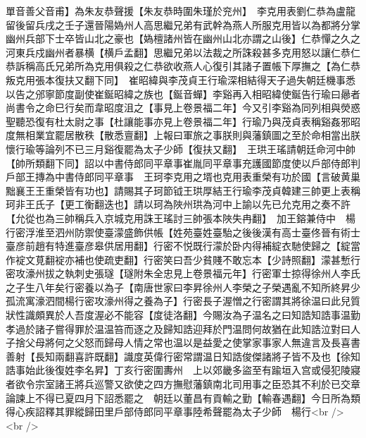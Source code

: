 單音善父音甫】為朱友恭聲援【朱友恭時圍朱瑾於兖州】　李克用表劉仁恭為盧龍留後留兵戌之壬子還晉陽媯州人高思繼兄弟有武幹為燕人所服克用皆以為都將分掌幽州兵部下士卒皆山北之豪也【媯檀諸州皆在幽州山北亦謂之山後】仁恭憚之久之河東兵戍幽州者暴横【横戶孟翻】思繼兄弟以法裁之所誅殺甚多克用怒以讓仁恭仁恭訴稱高氏兄弟所為克用俱殺之仁恭欲收燕人心復引其諸子置帳下厚撫之【為仁恭叛克用張本復扶又翻下同】　崔昭緯與李茂貞王行瑜深相結得天子過失朝廷機事悉以告之邠寧節度副使崔鋋昭緯之族也【鋋音蟬】李谿再入相昭緯使鋋告行瑜曰曏者尚書令之命巳行矣而韋昭度沮之【事見上卷景福二年】今又引李谿為同列相與熒惑聖聽恐復有杜太尉之事【杜讓能事亦見上卷景福二年】行瑜乃與茂貞表稱谿姦邪昭度無相業宜罷居散秩【散悉亶翻】上報曰軍旅之事朕則與藩鎮圖之至於命相當出朕懷行瑜等論列不已三月谿復罷為太子少師【復扶又翻】　王珙王瑤請朝廷命河中帥【帥所類翻下同】詔以中書侍郎同平章事崔胤同平章事充護國節度使以戶部侍郎判戶部王摶為中書侍郎同平章事　王珂李克用之壻也克用表重榮有功於國【言破黄巢黜襄王王重榮皆有功也】請賜其子珂節钺王珙厚結王行瑜李茂貞韓建三帥更上表稱珂非王氏子【更工衡翻迭也】請以珂為陜州珙為河中上諭以先已允克用之奏不許【允從也為三帥稱兵入京城克用誅王瑤討三帥張本陜失冉翻】　加王鎔兼侍中　楊行密浮淮至泗州防禦使臺濛盛飾供帳【姓苑臺姓臺駘之後後漢有高士臺佟晉有術士臺彦前趙有特進臺彦皋供居用翻】行密不悦既行濛於卧内得補綻衣馳使歸之【綻當作䘺文莧翻䘺亦補也使疏吏翻】行密笑曰吾少貧賤不敢忘本【少詩照翻】濛甚慙行密攻濠州拔之執刺史張璲【璲附朱全忠見上卷景福元年】行密軍士掠得徐州人李氏之子生八年矣行密養以為子【南唐世家曰李昇徐州人李榮之子榮遇亂不知所終昇少孤流寓濠泗間楊行密攻濠州得之養為子】行密長子渥憎之行密謂其將徐温曰此兒質狀性識頗異於人吾度渥必不能容【度徒洛翻】今賜汝為子温名之曰知誥知誥事温勤孝過於諸子嘗得罪於温温笞而逐之及歸知誥迎拜於門温問何故猶在此知誥泣對曰人子捨父母將何之父怒而歸母人情之常也温以是益愛之使掌家事家人無違言及長喜書善射【長知兩翻喜許既翻】識度英偉行密常謂温日知誥俊傑諸將子皆不及也【徐知誥事始此後復姓李名昇】丁亥行密圍夀州　上以郊畿多盜至有踰垣入宫或侵犯陵寢者欲令宗室諸王將兵巡警又欲使之四方撫慰藩鎮南北司用事之臣恐其不利於已交章論諫上不得已夏四月下詔悉罷之　朝廷以董昌有貢輸之勤【輸春遇翻】今日所為類得心疾詔釋其罪縱歸田里戶部侍郎同平章事陸希聲罷為太子少師　楊行<br />
<br />
